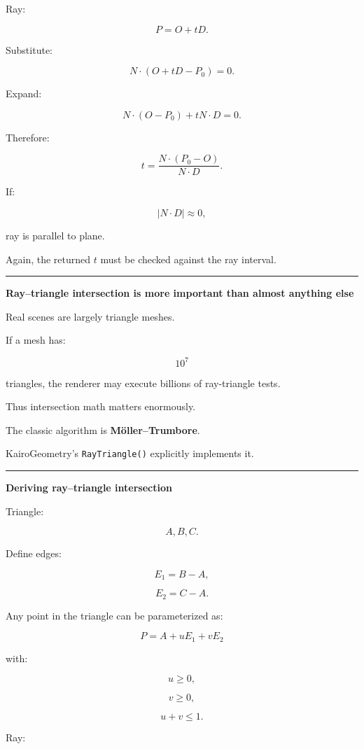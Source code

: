 Ray:

\[
P=O+tD.
\]

Substitute:

\[
N\cdot(O+tD-P_0)=0.
\]

Expand:

\[
N\cdot(O-P_0)+tN\cdot D=0.
\]

Therefore:

\[
\boxed{
t=
\frac{
N\cdot(P_0-O)
}{
N\cdot D
}.
}
\]

If:

\[
|N\cdot D|\approx0,
\]

ray is parallel to plane.

Again, the returned \(t\) must be checked against the ray interval.

\begin{center}\rule{0.5\linewidth}{0.5pt}\end{center}

\textbf{Ray--triangle intersection is more important than almost anything else}

Real scenes are largely triangle meshes.

If a mesh has:

\[
10^7
\]

triangles, the renderer may execute billions of ray-triangle tests.

Thus intersection math matters enormously.

The classic algorithm is \textbf{Möller--Trumbore}.

KairoGeometry's \texttt{RayTriangle()} explicitly implements it.

\begin{center}\rule{0.5\linewidth}{0.5pt}\end{center}

\textbf{Deriving ray--triangle intersection}

Triangle:

\[
A,B,C.
\]

Define edges:

\[
E_1=B-A,
\]

\[
E_2=C-A.
\]

Any point in the triangle can be parameterized as:

\[
P=A+uE_1+vE_2
\]

with:

\[
u\ge0,
\]

\[
v\ge0,
\]

\[
u+v\le1.
\]

Ray:


